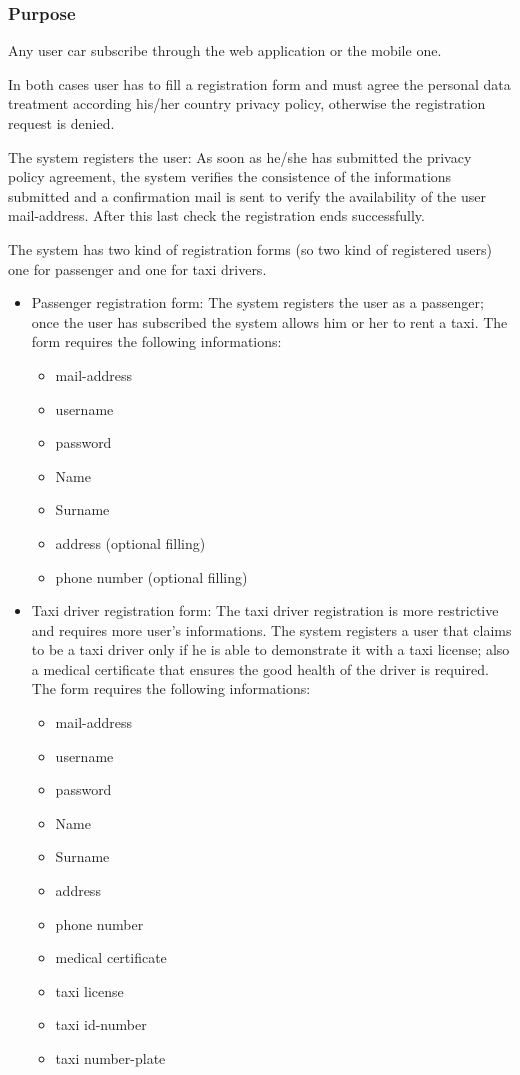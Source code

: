 \label{user-registration}
\subsubsection{Purpose}
Any user car subscribe through the web application or the mobile one. 

In both cases user has to fill a registration form and must agree the personal data treatment according his/her country privacy policy, otherwise the registration request is denied.

The system registers the user: 
As soon as he/she has submitted the privacy policy agreement, the system verifies the consistence of the informations submitted and a confirmation mail is sent to verify the availability of the user mail-address. 
After this last check the registration ends successfully.

The system has two kind of registration forms (so two kind of registered users) one for passenger and one for taxi drivers.


\begin{itemize}
\item Passenger registration form: 
The system registers the user as a passenger; once the user has subscribed the system allows him or her to rent a taxi. 
The form requires the following informations:
\begin{itemize}
\item mail-address
\item username 
\item password
\item Name
\item Surname
\item address (optional filling)
\item phone number (optional filling)
\end{itemize}




\item Taxi driver registration form: 
The taxi driver registration is more restrictive and requires more user's informations.
The system registers a user that claims to be a taxi driver only if he is able to demonstrate it with a taxi license; also a medical certificate that ensures the good health of the driver is required.
The form requires the following informations:

\begin{itemize}
\item mail-address
\item username 
\item password
\item Name
\item Surname
\item address 
\item phone number
\item medical certificate
\item taxi license
\item taxi id-number
\item taxi number-plate
\end{itemize}
\end{itemize}



